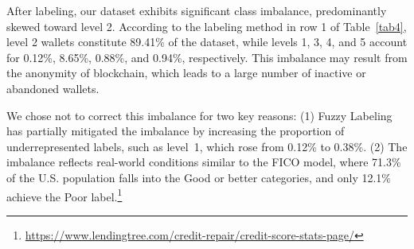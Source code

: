 \documentclass[runningheads]{llncs}
\begin{document}
{After labeling, our dataset exhibits significant class imbalance, predominantly skewed toward level 2. According to the labeling method in row 1 of Table~\ref{tab4}, level 2 wallets constitute 89.41\% of the dataset, while levels 1, 3, 4, and 5 account for 0.12\%, 8.65\%, 0.88\%, and 0.94\%, respectively. This imbalance may result from the anonymity of blockchain, which leads to a large number of inactive or abandoned wallets. %

We chose not to correct this imbalance for two key reasons: (1) Fuzzy Labeling has partially mitigated the imbalance by increasing the proportion of underrepresented labels, such as level~1, which rose from 0.12\% to 0.38\%. (2) The imbalance reflects real-world conditions similar to the FICO model, where 71.3\% of the U.S. population falls into the Good or better categories, and only 12.1\% achieve the Poor label.\footnote{\href{https://www.lendingtree.com/credit-repair/credit-score-stats-page/}{https://www.lendingtree.com/credit-repair/credit-score-stats-page/}}

}
\end{document}
